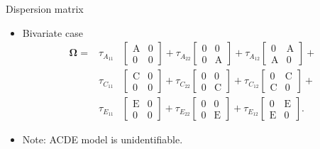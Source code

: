 \documentclass[
  ignorenonframetext,
  serif,
  professionalfont,
  usenames,
  dvipsnames,
  aspectratio = 169]{beamer}
\begin{document}
\begin{frame}{Dispersion matrix}
\protect\hypertarget{dispersion-matrix}{}
\begin{itemize}
\item
  Bivariate case \begin{eqnarray*}
  \boldsymbol{\Omega} = &\tau_{A_{11}} & \nonumber
  \begin{bmatrix}
  \mathrm{A} & \mathrm{0} \\ 
  \mathrm{0} & \mathrm{0}
  \end{bmatrix} + \tau_{A_{22}}
  \begin{bmatrix}
  \mathrm{0} & \mathrm{0} \\ 
  \mathrm{0} & \mathrm{A}
  \end{bmatrix} + \tau_{A_{12}}
  \begin{bmatrix}
  \mathrm{0} & \mathrm{A} \\ 
  \mathrm{A} & \mathrm{0}
  \end{bmatrix} + \\ \nonumber
  & \tau_{C_{11}} &
  \begin{bmatrix}
  \mathrm{C} & \mathrm{0} \\ 
  \mathrm{0} & \mathrm{0}
  \end{bmatrix} + \tau_{C_{22}}
  \begin{bmatrix}
  \mathrm{0} & \mathrm{0} \\ 
  \mathrm{0} & \mathrm{C}
  \end{bmatrix} + \tau_{C_{12}}
  \begin{bmatrix}
  \mathrm{0} & \mathrm{C} \\ 
  \mathrm{C} & \mathrm{0}
  \end{bmatrix} + \\
  &\tau_{E_{11}}& 
  \begin{bmatrix}
  \mathrm{E} & \mathrm{0} \\ 
  \mathrm{0} & \mathrm{0}
  \end{bmatrix} + \tau_{E_{22}}
  \begin{bmatrix}
  \mathrm{0} & \mathrm{0} \\ 
  \mathrm{0} & \mathrm{E}
  \end{bmatrix} + \tau_{E_{12}}
  \begin{bmatrix}
  \mathrm{0} & \mathrm{E} \\ 
  \mathrm{E} & \mathrm{0}
  \end{bmatrix}.
  \end{eqnarray*}
\item
  Note: ACDE model is unidentifiable.
\end{itemize}
\end{frame}
\end{document}
